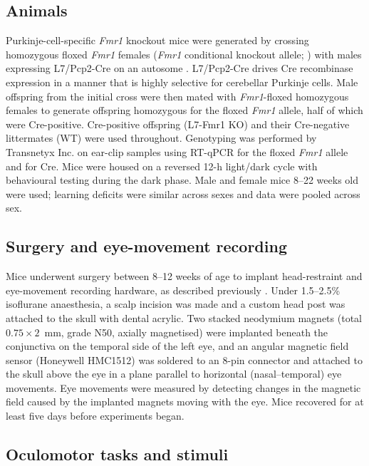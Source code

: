 \documentclass[11pt]{article}
\begin{document}
\subsection{Animals}

Purkinje-cell-specific \textit{Fmr1} knockout mice were generated by
crossing homozygous floxed \textit{Fmr1} females (\textit{Fmr1} conditional
knockout allele; \citealp{mientjes2006conditional}) with males expressing
L7/Pcp2-Cre on an autosome \citep{zhang2004l7cre}. L7/Pcp2-Cre drives
Cre recombinase expression in a manner that is highly selective for
cerebellar Purkinje cells. Male offspring from the initial cross were then
mated with \textit{Fmr1}-floxed homozygous females to generate offspring
homozygous for the floxed \textit{Fmr1} allele, half of which were
Cre-positive. Cre-positive offspring (L7-Fmr1 KO) and their Cre-negative
littermates (WT) were used throughout. Genotyping was performed by
Transnetyx Inc. on ear-clip samples using RT-qPCR for the floxed
\textit{Fmr1} allele and for Cre. Mice were housed on a reversed 12-h
light/dark cycle with behavioural testing during the dark phase. Male and
female mice 8--22 weeks old were used; learning deficits were similar
across sexes and data were pooled across sex.

\subsection{Surgery and eye-movement recording}

Mice underwent surgery between 8--12 weeks of age to implant head-restraint
and eye-movement recording hardware, as described previously
\citep{nguyenvu2017saturation}. Under 1.5--2.5\% isoflurane anaesthesia, a
scalp incision was made and a custom head post was attached to the skull
with dental acrylic. Two stacked neodymium magnets (total $0.75 \times 2$~mm,
grade N50, axially magnetised) were implanted beneath the conjunctiva on
the temporal side of the left eye, and an angular magnetic field sensor
(Honeywell HMC1512) was soldered to an 8-pin connector and attached to
the skull above the eye in a plane parallel to horizontal (nasal--temporal)
eye movements. Eye movements were measured by detecting changes in the
magnetic field caused by the implanted magnets moving with the eye. Mice
recovered for at least five days before experiments began.

\subsection{Oculomotor tasks and stimuli}
\end{document}

